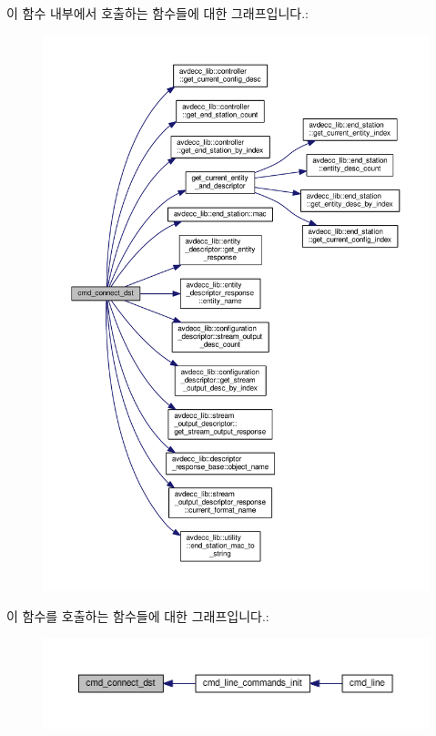 이 함수 내부에서 호출하는 함수들에 대한 그래프입니다.\+:
\nopagebreak
\begin{figure}[H]
\begin{center}
\leavevmode
\includegraphics[width=350pt]{classcmd__line_ad7dd82af67a144efd5aa3330d888d04c_cgraph}
\end{center}
\end{figure}




이 함수를 호출하는 함수들에 대한 그래프입니다.\+:
\nopagebreak
\begin{figure}[H]
\begin{center}
\leavevmode
\includegraphics[width=350pt]{classcmd__line_ad7dd82af67a144efd5aa3330d888d04c_icgraph}
\end{center}
\end{figure}


